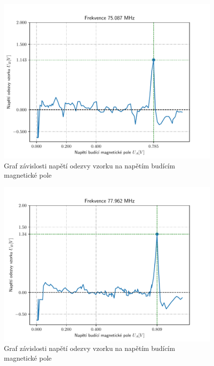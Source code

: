 \documentclass{article}
\begin{document}
\begin{figure}[!h]
  \hspace*{-10em}
  \includegraphics[scale=1.2]{figs/7.pdf}
  \caption{Graf závislosti napětí odezvy vzorku na napětím budícím magnetické pole}
\end{figure}
\clearpage
\begin{figure}[!h]
  \hspace*{-10em}
  \includegraphics[scale=1.2]{figs/8.pdf}
  \caption{Graf závislosti napětí odezvy vzorku na napětím budícím magnetické pole}
\end{figure}
\newpage
\end{document}
